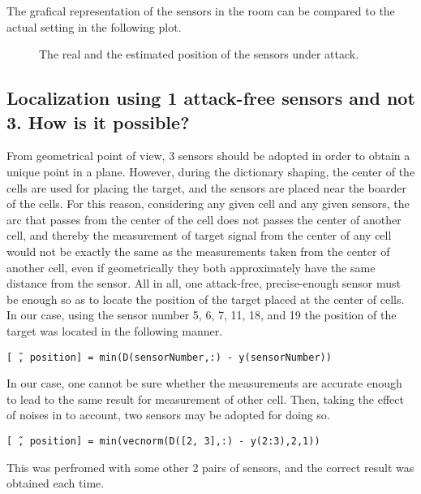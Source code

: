 The grafical representation of the sensors in the room can be compared to the actual setting in the following plot.

\begin{figure}[H]
    \centering
    \hspace{1cm} %
    \caption{The real and the estimated position of the sensors under attack.}
\end{figure}

\subsection{Localization using 1 attack-free sensors and not 3. How is it possible?}
From geometrical point of view, 3 sensors should be adopted in order to obtain a unique point in a plane. However, during the dictionary shaping, the center of the cells are used for placing the target, and the sensors are placed near the boarder of the cells. For this reason, considering any given cell and any given sensors, the arc that passes from the center of the cell does not passes the center of another cell, and thereby the measurement of target signal from the center of any cell would not be exactly the same as the measurements taken from the center of another cell, even if geometrically they both approximately have the same distance from the sensor. All in all, one attack-free, precise-enough sensor must be enough so as to locate the position of the target placed at the center of cells. In our case, using the sensor number 5, 6, 7, 11, 18, and 19 the position of the target was located in the following manner.

\texttt{[\~ \,, position] = min(D(sensorNumber,:) - y(sensorNumber))}

In our case, one cannot be sure whether the measurements are accurate enough to lead to the same result for measurement of other cell. Then, taking the effect of noises in to account, two sensors may be adopted for doing so.

\texttt{[\~ \,, position] = min(vecnorm(D([2, 3],:) - y(2:3),2,1))}

This was perfromed with some other 2 pairs of sensors, and the correct result was obtained each time. 


